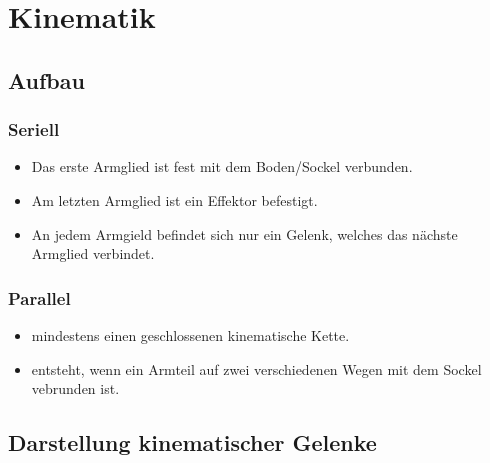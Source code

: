 \clearpage
\section{Kinematik}
\subsection{Aufbau}
\begin{minipage}{0.5\linewidth}
\subsubsection{Seriell}
\begin{itemize}
    \item Das erste Armglied ist fest mit dem Boden/Sockel verbunden.
    \item Am letzten Armglied ist ein Effektor befestigt.
    \item An jedem Armgield befindet sich nur ein Gelenk, welches das nächste Armglied verbindet.  
\end{itemize}
\end{minipage}
\begin{minipage}{0.5\linewidth}
\subsubsection{Parallel}
\begin{itemize}
    \item mindestens einen geschlossenen kinematische Kette.
    \item entsteht, wenn ein Armteil auf zwei verschiedenen Wegen mit dem Sockel vebrunden ist.
\end{itemize}
\end{minipage}
	\subsection{Darstellung kinematischer Gelenke }

